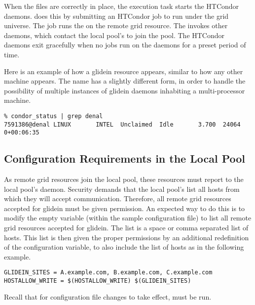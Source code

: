 When the files are correctly in place,
the execution task starts the HTCondor daemons.
 does this by submitting an HTCondor job
to run under the grid universe.
The job runs the  on the remote grid resource.
The  invokes other daemons, which contact
the local pool's  to join the pool.
The HTCondor daemons exit gracefully when no jobs run on the daemons for a
preset period of time.

Here is an example of how a glidein resource appears, similar to how
any other machine appears.  The name has a
slightly different form, in order to handle the possibility of
multiple instances of glidein daemons inhabiting a multi-processor
machine.

\footnotesize
\begin{verbatim}
% condor_status | grep denal
7591386@denal LINUX       INTEL  Unclaimed  Idle       3.700  24064  0+00:06:35

\end{verbatim}
\normalsize

\subsection{Configuration Requirements in the Local Pool}

As remote grid resources join the local pool,
these resources must report to the local pool's  daemon.
Security demands that the local pool's  
list all hosts from which they will accept communication.
Therefore, all remote grid resources accepted for glidein
must be given
 permission.
An expected way to do this is to modify the empty variable
(within the sample configuration file)
 to list all remote grid resources
accepted for glidein.
The list is a space or comma separated list of hosts.
This list is then given the proper permissions by an additional
redefinition of the  configuration variable,
to also include the list of hosts
as in the following example.

\footnotesize
\begin{verbatim}
GLIDEIN_SITES = A.example.com, B.example.com, C.example.com
HOSTALLOW_WRITE = $(HOSTALLOW_WRITE) $(GLIDEIN_SITES)
\end{verbatim}
\normalsize
Recall that for configuration file changes to take effect,
 must be run.

